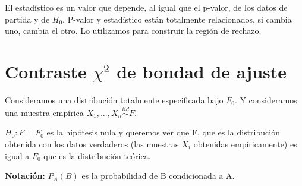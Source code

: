 \documentclass[palatino,nochap]{apuntes}
\begin{document}
\begin{defn}[T = valor Estadístico]
El estadístico es un valor que depende, al igual que el p-valor, de los datos de partida y de $H_0$. P-valor y estadístico están totalmente relacionados, si cambia uno, cambia el otro. Lo utilizamos para construir la región de rechazo.
\end{defn}

\section{Contraste $\chi^2$ de bondad de ajuste}
Consideramos una distribución totalmente especificada bajo $F_0$. Y consideramos una muestra empírica $X_1,...,X_n \stackrel{iid}{\sim} F$.

$H_0: F=F_0$ es la hipótesis nula y queremos ver que F, que es la distribución obtenida con los datos verdaderos (las muestras $X_i$ obtenidas empíricamente) es igual a $F_0$ que es la distribución teórica.

\textbf{Notación: }$P_A(B)$ es la probabilidad de B condicionada a A.
\end{document}
